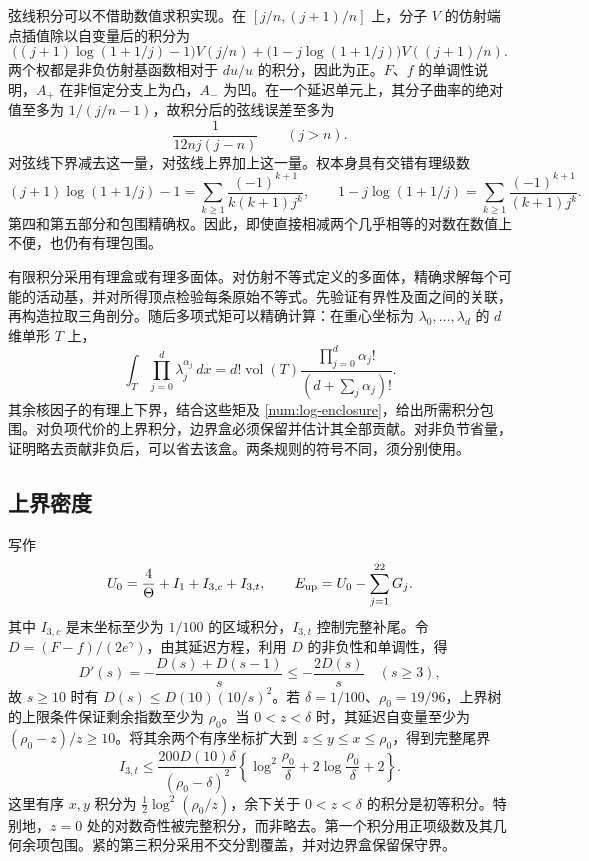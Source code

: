 弦线积分可以不借助数值求积实现。在 $[j/n,(j+1)/n]$ 上，分子 $V$ 的仿射端点插值除以自变量后的积分为
\[
 \bigl((j+1)\log(1+1/j)-1\bigr)V(j/n)
 +\bigl(1-j\log(1+1/j)\bigr)V((j+1)/n).
\]
两个权都是非负仿射基函数相对于 $du/u$ 的积分，因此为正。$F$、$f$ 的单调性说明，$A_+$ 在非恒定分支上为凸，$A_-$ 为凹。在一个延迟单元上，其分子曲率的绝对值至多为 $1/(j/n-1)$，故积分后的弦线误差至多为
\[
 \frac{1}{12nj(j-n)}\qquad(j>n).
\]
对弦线下界减去这一量，对弦线上界加上这一量。权本身具有交错有理级数
\[
 (j+1)\log(1+1/j)-1
  =\sum_{k\ge1}\frac{(-1)^{k+1}}{k(k+1)j^k},\qquad
 1-j\log(1+1/j)
  =\sum_{k\ge1}\frac{(-1)^{k+1}}{(k+1)j^k}.
\]
第四和第五部分和包围精确权。因此，即使直接相减两个几乎相等的对数在数值上不便，也仍有有理包围。

有限积分采用有理盒或有理多面体。对仿射不等式定义的多面体，精确求解每个可能的活动基，并对所得顶点检验每条原始不等式。先验证有界性及面之间的关联，再构造拉取三角剖分。随后多项式矩可以精确计算：在重心坐标为 $\lambda_0,\ldots,\lambda_d$ 的 $d$ 维单形 $T$ 上，
\begin{equation}
 \int_T\prod_{j=0}^d\lambda_j^{\alpha_j}\,dx
 =d!\operatorname{vol}(T)
   \frac{\prod_{j=0}^d\alpha_j!}{(d+\sum_j\alpha_j)!}.
 \label{num:simplex-moment}
\end{equation}
其余核因子的有理上下界，结合这些矩及 \eqref{num:log-enclosure}，给出所需积分包围。对负项代价的上界积分，边界盒必须保留并估计其全部贡献。对非负节省量，证明略去贡献非负后，可以省去该盒。两条规则的符号不同，须分别使用。

\subsection{上界密度}
写作
\[
 U_0=\frac4\Theta+I_1+I_{3,c}+I_{3,t},\qquad
 E_{\rm up}=U_0-\sum_{j=1}^{22}G_j.
\]
其中 $I_{3,c}$ 是末坐标至少为 $1/100$ 的区域积分，$I_{3,t}$ 控制完整补尾。令 $D=(F-f)/(2e^\gamma)$，由其延迟方程，利用 $D$ 的非负性和单调性，得
\[
 D'(s)=-\frac{D(s)+D(s-1)}s\le-\frac{2D(s)}s
 \quad(s\ge3),
\]
故 $s\ge10$ 时有 $D(s)\le D(10)(10/s)^2$。若 $\delta=1/100$、$\rho_0=19/96$，上界树的上限条件保证剩余指数至少为 $\rho_0$。当 $0<z<\delta$ 时，其延迟自变量至少为 $(\rho_0-z)/z\ge10$。将其余两个有序坐标扩大到 $z\le y\le x\le\rho_0$，得到完整尾界
\begin{equation}
 I_{3,t}\le
 \frac{200D(10)\delta}{(\rho_0-\delta)^2}
 \left\{\log^2\frac{\rho_0}{\delta}
        +2\log\frac{\rho_0}{\delta}+2\right\}.
 \label{num:complete-tail}
\end{equation}
这里有序 $x,y$ 积分为 $\tfrac12\log^2(\rho_0/z)$，余下关于 $0<z<\delta$ 的积分是初等积分。特别地，$z=0$ 处的对数奇性被完整积分，而非略去。第一个积分用正项级数及其几何余项包围。紧的第三积分采用不交分割覆盖，并对边界盒保留保守界。

